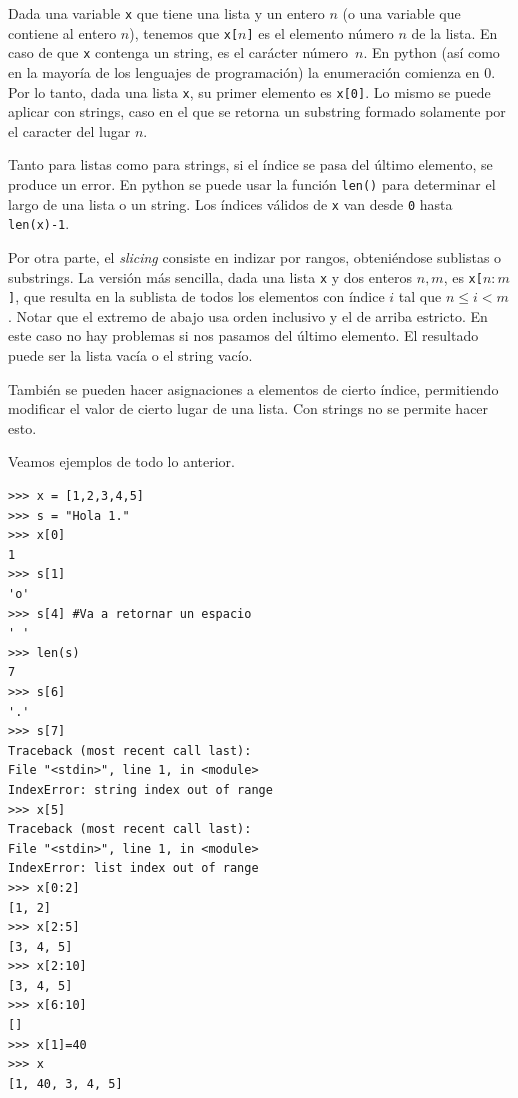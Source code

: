 \documentclass[a4paper, 12pt]{report}
\theoremstyle{definition}
\begin{document}
Dada una variable {\tt x} que tiene una lista y un entero $n$ (o una variable que contiene al entero $n$), tenemos que {\tt x[$n$]} es el elemento número $n$ de la lista. En caso de que {\tt x} contenga un string, es el carácter número~$n$. En python (así como en la mayoría de los lenguajes de programación) la enumeración comienza en 0. Por lo tanto, dada una lista {\tt x}, su primer elemento es {\tt x[0]}. Lo mismo se puede aplicar con strings, caso en el que se retorna un substring formado solamente por el caracter del lugar $n$.

Tanto para listas como para strings, si el índice se pasa del último elemento, se produce un error. En python se puede usar la función {\tt len()} para determinar el largo de una lista o un string. Los índices válidos de {\tt x} van desde {\tt 0} hasta {\tt len(x)-1}.

Por otra parte, el {\sl slicing} consiste en indizar por rangos, obteniéndose sublistas o substrings. La versión más sencilla, dada una lista {\tt x} y dos enteros $n,m$, es {\tt x[$n:m$]}, que resulta en la sublista de todos los elementos con índice $i$ tal que $n\leq i < m$. Notar que el extremo de abajo usa orden inclusivo y el de arriba estricto. En este caso no hay problemas si nos pasamos del último elemento. El resultado puede ser la lista vacía o el string vacío.

También se pueden hacer asignaciones a elementos de cierto índice, permitiendo modificar el valor de cierto lugar de una lista. Con strings no se permite hacer esto.

Veamos ejemplos de todo lo anterior.
\begin{verbatim}
>>> x = [1,2,3,4,5]
>>> s = "Hola 1."
>>> x[0]
1
>>> s[1]
'o'
>>> s[4] #Va a retornar un espacio
' '
>>> len(s)
7
>>> s[6]
'.'
>>> s[7]
Traceback (most recent call last):
File "<stdin>", line 1, in <module>
IndexError: string index out of range
>>> x[5]
Traceback (most recent call last):
File "<stdin>", line 1, in <module>
IndexError: list index out of range
>>> x[0:2]
[1, 2]
>>> x[2:5]
[3, 4, 5]
>>> x[2:10]
[3, 4, 5]
>>> x[6:10]
[]
>>> x[1]=40
>>> x
[1, 40, 3, 4, 5]
\end{verbatim}
\end{document}
